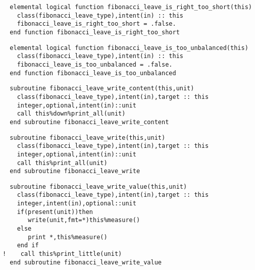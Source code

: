 \begin{Verbatim}
  elemental logical function fibonacci_leave_is_right_too_short(this)
    class(fibonacci_leave_type),intent(in) :: this
    fibonacci_leave_is_right_too_short = .false.
  end function fibonacci_leave_is_right_too_short
\end{Verbatim}

\begin{Verbatim}
  elemental logical function fibonacci_leave_is_too_unbalanced(this)
    class(fibonacci_leave_type),intent(in) :: this
    fibonacci_leave_is_too_unbalanced = .false.
  end function fibonacci_leave_is_too_unbalanced
\end{Verbatim}
\MethodsNTB

\begin{Verbatim}
  subroutine fibonacci_leave_write_content(this,unit)
    class(fibonacci_leave_type),intent(in),target :: this
    integer,optional,intent(in)::unit
    call this%down%print_all(unit)
  end subroutine fibonacci_leave_write_content
\end{Verbatim}

\begin{Verbatim}
  subroutine fibonacci_leave_write(this,unit)
    class(fibonacci_leave_type),intent(in),target :: this
    integer,optional,intent(in)::unit
    call this%print_all(unit)
  end subroutine fibonacci_leave_write
\end{Verbatim}

\begin{Verbatim}
  subroutine fibonacci_leave_write_value(this,unit)
    class(fibonacci_leave_type),intent(in),target :: this
    integer,intent(in),optional::unit
    if(present(unit))then
       write(unit,fmt=*)this%measure()
    else
       print *,this%measure()
    end if
!    call this%print_little(unit)
  end subroutine fibonacci_leave_write_value
\end{Verbatim}

